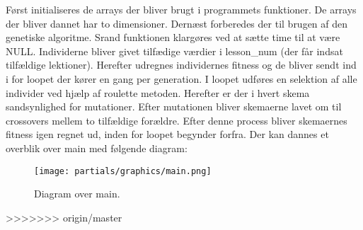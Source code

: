 Først initialiseres de arrays der bliver brugt i programmets funktioner. De arrays der bliver dannet har to dimensioner.
Dernæst forberedes der til brugen af den genetiske algoritme. Srand funktionen klargøres ved at sætte time til at være NULL. %
Individerne bliver givet tilfædige værdier i lesson_num (der får indsat tilfældige lektioner). Herefter udregnes individernes fitness og de bliver sendt ind i for loopet der kører en gang per generation. I loopet udføres en selektion af alle individer ved hjælp af roulette metoden. Herefter er der i hvert skema sandsynlighed for mutationer. Efter mutationen bliver skemaerne lavet om til crossovers mellem to tilfældige forældre. Efter denne process bliver skemaernes fitness igen regnet ud, inden for loopet begynder forfra. Der kan dannes et overblik over main med følgende diagram:
\begin{figure}[!h]
  \centering
  \texttt{[image: partials/graphics/main.png]}
  \caption{Diagram over main.}
  \label{fig:main}
\end{figure}
>>>>>>> origin/master
